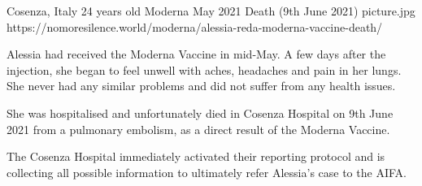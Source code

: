 {Cosenza, Italy}
{24 years old}
{Moderna}
{May 2021}
{Death (9th June 2021)}
{picture.jpg}
{https://nomoresilence.world/moderna/alessia-reda-moderna-vaccine-death/}
{

Alessia had received the Moderna Vaccine in mid-May. A few days after the
injection, she began to feel unwell with aches, headaches and pain in her
lungs. She never had any similar problems and did not suffer from any health
issues.

She was hospitalised and unfortunately died in Cosenza Hospital on 9th June 2021
from a pulmonary embolism, as a direct result of the Moderna Vaccine.

The Cosenza Hospital immediately activated their reporting protocol and is
collecting all possible information to ultimately refer Alessia’s case to the
AIFA.

}
